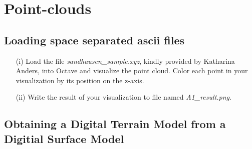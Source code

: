 \documentclass[fontsize=13pt,a4paper]{article}
\begin{document}
\section{Point-clouds}

\subsection{Loading space separated ascii files}

\begin{itemize}
    \item[(i)]
        Load the file \emph{sandhausen\_sample.xyz},
        kindly provided by Katharina Anders, into Octave
        and visualize the point cloud. Color each point in your
        visualization by its position on the z-axis.

    \item[(ii)]
        Write the result of your visualization to file named
        \emph{A1\_result.png}.
\end{itemize}

\subsection{Obtaining a Digital Terrain Model from a Digitial Surface Model}
\end{document}
